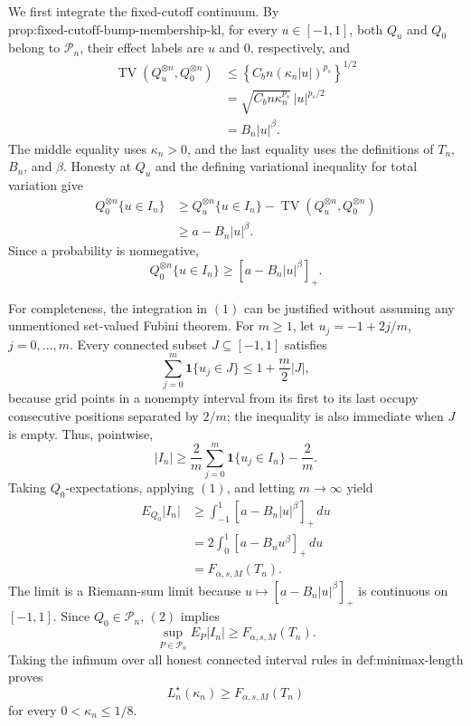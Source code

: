 We first integrate the fixed-cutoff continuum.  By
\(\text{prop:fixed-cutoff-bump-membership-kl}\), for every
\(u\in[-1,1]\), both \(Q_u\) and \(Q_0\) belong to \(\mathcal P_n\),
their effect labels are \(u\) and \(0\), respectively, and
\[
 \begin{aligned}
 \operatorname{TV}(Q_u^{\otimes n},Q_0^{\otimes n})
 &\le\left\{C_b n(\kappa_n|u|)^{p_s}\right\}^{1/2}\\
 &=\sqrt{C_bn\kappa_n^{p_s}}\,|u|^{p_s/2}\\
 &=B_n|u|^\beta.
 \end{aligned}
\]
The middle equality uses \(\kappa_n>0\), and the last equality uses the
definitions of \(T_n\), \(B_n\), and \(\beta\).  Honesty at \(Q_u\)
and the defining variational inequality for total variation give
\[
 \begin{aligned}
 Q_0^{\otimes n}\{u\in I_n\}
 &\ge Q_u^{\otimes n}\{u\in I_n\}
      -\operatorname{TV}(Q_u^{\otimes n},Q_0^{\otimes n})\\
 &\ge a-B_n|u|^\beta.
 \end{aligned}
\]
Since a probability is nonnegative,
\[
 Q_0^{\otimes n}\{u\in I_n\}
 \ge[a-B_n|u|^\beta]_+.
 \tag{1}
\]

For completeness, the integration in \((1)\) can be justified without
assuming any unmentioned set-valued Fubini theorem.  For \(m\ge1\), let
\(u_j=-1+2j/m\), \(j=0,\ldots,m\).  Every connected subset
\(J\subseteq[-1,1]\) satisfies
\[
 \sum_{j=0}^m\mathbf 1\{u_j\in J\}\le1+\frac m2|J|,
\]
because grid points in a nonempty interval from its first to its last
occupy consecutive positions separated by \(2/m\); the inequality is
also immediate when \(J\) is empty.  Thus, pointwise,
\[
 |I_n|\ge\frac2m\sum_{j=0}^m\mathbf 1\{u_j\in I_n\}-\frac2m.
\]
Taking \(Q_0\)-expectations, applying \((1)\), and letting
\(m\to\infty\) yield
\[
 \begin{aligned}
 E_{Q_0}|I_n|
 &\ge\int_{-1}^1[a-B_n|u|^\beta]_+\,du\\
 &=2\int_0^1[a-B_nu^\beta]_+\,du\\
 &=F_{\alpha,s,M}(T_n).
 \tag{2}
 \end{aligned}
\]
The limit is a Riemann-sum limit because
\(u\mapsto[a-B_n|u|^\beta]_+\) is continuous on \([-1,1]\).
Since \(Q_0\in\mathcal P_n\), \((2)\) implies
\[
 \sup_{P\in\mathcal P_n}E_P|I_n|\ge F_{\alpha,s,M}(T_n).
\]
Taking the infimum over all honest connected interval rules in
\(\text{def:minimax-length}\) proves
\[
 L_n^\star(\kappa_n)\ge F_{\alpha,s,M}(T_n)
\]
for every \(0<\kappa_n\le1/8\).

